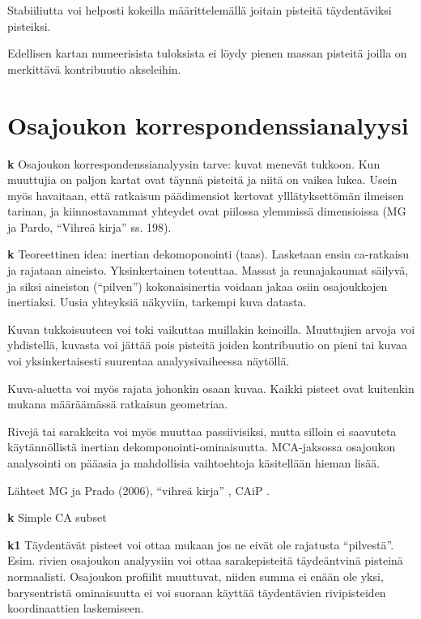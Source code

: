 \documentclass[
  finnish,
]{book}
\begin{document}
Stabiiliutta voi helposti kokeilla määrittelemällä joitain pisteitä täydentäviksi
pisteiksi.

Edellisen kartan numeerisista tuloksista ei löydy pienen massan pisteitä joilla
on merkittävä kontribuutio akseleihin.

\hypertarget{osajoukon-korrespondenssianalyysi}{%
\chapter{Osajoukon korrespondenssianalyysi}\label{osajoukon-korrespondenssianalyysi}}

\textbf{k} Osajoukon korrespondenssianalyysin tarve: kuvat menevät tukkoon. Kun muuttujia
on paljon kartat ovat täynnä pisteitä ja niitä on vaikea lukea. Usein myös havaitaan,
että ratkaisun päädimensiot kertovat ylllätyksettömän ilmeisen tarinan, ja
kiinnostavammat yhteydet ovat piilossa ylemmissä dimensioissa (MG ja Pardo, ``Vihreä
kirja'' ss. 198).

\textbf{k} Teoreettinen idea: inertian dekomoponointi (taas). Lasketaan ensin
ca-ratkaisu ja rajataan aineisto. Yksinkertainen toteuttaa. Massat ja reunajakaumat
säilyvä, ja siksi aineiston (``pilven'') kokonaisinertia voidaan jakaa osiin
osajoukkojen inertiaksi. Uusia yhteyksiä näkyviin, tarkempi kuva datasta.

Kuvan tukkoisuuteen voi toki vaikuttaa muillakin keinoilla. Muuttujien arvoja voi
yhdistellä, kuvasta voi jättää pois pisteitä joiden kontribuutio on pieni tai kuvaa
voi yksinkertaisesti suurentaa analyysivaiheessa näytöllä.

Kuva-aluetta voi myös rajata johonkin osaan kuvaa. Kaikki pisteet ovat kuitenkin
mukana määräämässä ratkaisun geometriaa.

Rivejä tai sarakkeita voi myös muuttaa passiivisiksi, mutta silloin ei saavuteta
käytännöllistä inertian dekomponointi-ominaisuutta. MCA-jaksossa osajoukon
analysointi on pääasia ja mahdollisia vaihtoehtoja käsitellään hieman lisää.

Lähteet MG ja Prado (2006)\citep{RefWorks:doc:5a857a44e4b0ed2d44664d87},
``vihreä kirja'' \citep{RefWorks:doc:5ab76b43e4b003f4468d1f07},
CAiP \citep{RefWorks:doc:5a857a43e4b0ed2d44664d78}.

\textbf{k} Simple CA subset

\textbf{k1} Täydentävät pisteet voi ottaa mukaan jos ne eivät ole rajatusta ``pilvestä''.
Esim. rivien osajoukon analyysiin voi ottaa sarakepisteitä täydeäntvinä pisteinä
normaalisti. Osajoukon profiilit muuttuvat, niiden summa ei enään ole yksi,
barysentristä ominaisuutta ei voi suoraan käyttää täydentävien rivipisteiden
koordinaattien laskemiseen.
\end{document}
